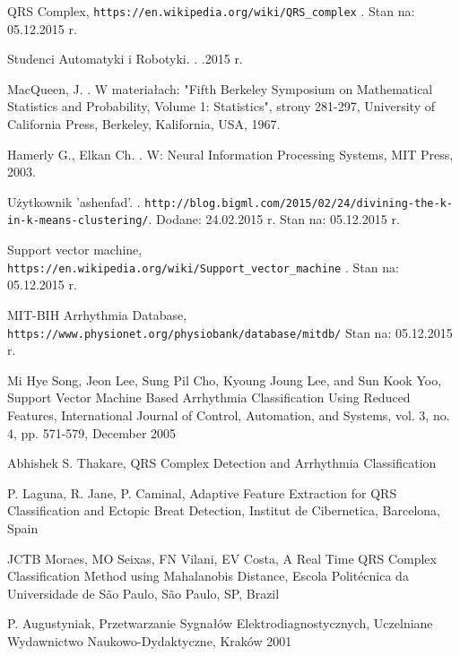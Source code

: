 
\begin{thebibliography}{99} %

 
QRS Complex,
\newblock \texttt{https://en.wikipedia.org/wiki/QRS\_complex} .
\newblock Stan na: 05.12.2015 r.

Studenci Automatyki i Robotyki.
.
.2015 r.

MacQueen, J.
.
\newblock W materiałach: "Fifth Berkeley Symposium on Mathematical Statistics and Probability, Volume 1: Statistics", strony 281-297,
\newblock University of California Press, Berkeley, Kalifornia, USA, 1967. 

Hamerly G., Elkan Ch.
.
\newblock W: Neural Information Processing Systems,
\newblock MIT Press, 2003.

Użytkownik 'ashenfad'.
.
\newblock \texttt{http://blog.bigml.com/2015/02/24/divining-the-k-in-k-means-clustering/}. 
\newblock Dodane: 24.02.2015 r.
\newblock Stan na: 05.12.2015 r.

Support vector machine,
\newblock \texttt{https://en.wikipedia.org/wiki/Support\_vector\_machine} .
\newblock Stan na: 05.12.2015 r.

MIT-BIH Arrhythmia Database,
\newblock \texttt{https://www.physionet.org/physiobank/database/mitdb/}
\newblock Stan na: 05.12.2015 r.

Mi Hye Song, Jeon Lee, Sung Pil Cho, Kyoung Joung Lee, and Sun Kook Yoo,
\newblock Support Vector Machine Based Arrhythmia Classification Using Reduced Features,
\newblock 
International Journal of Control, Automation, and Systems, vol. 3, no. 4, pp. 571-579, December 2005 

Abhishek S. Thakare,
\newblock QRS Complex Detection and Arrhythmia Classification

P. Laguna, R. Jane, P. Caminal,
\newblock Adaptive Feature Extraction for QRS Classification and Ectopic Breat Detection,
\newblock Institut de Cibernetica, Barcelona, Spain


JCTB Moraes, MO Seixas, FN Vilani, EV Costa,
\newblock A Real Time QRS Complex Classification Method using Mahalanobis Distance,
\newblock Escola Politécnica da Universidade de São Paulo, São Paulo, SP, Brazil

P. Augustyniak,
\newblock Przetwarzanie Sygnałów Elektrodiagnostycznych,
\newblock Uczelniane Wydawnictwo Naukowo-Dydaktyczne, Kraków 2001

\end{thebibliography}